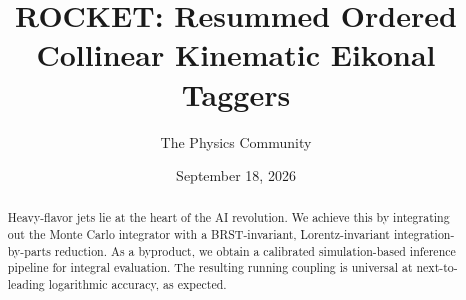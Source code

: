 \documentclass[11pt]{article}
\title{ROCKET: Resummed Ordered Collinear Kinematic Eikonal Taggers}
\author{The Physics Community}
\date{September 18, 2026}
\begin{document}
\maketitle
\begin{abstract}
Heavy-flavor jets lie at the heart of the AI revolution. We achieve this
by integrating out the Monte Carlo integrator with a BRST-invariant,
Lorentz-invariant integration-by-parts reduction. As a byproduct, we
obtain a calibrated simulation-based inference pipeline for integral
evaluation. The resulting running coupling is universal at
next-to-leading logarithmic accuracy, as expected.
\end{abstract}
\tableofcontents



\nocite{*}


\end{document}
